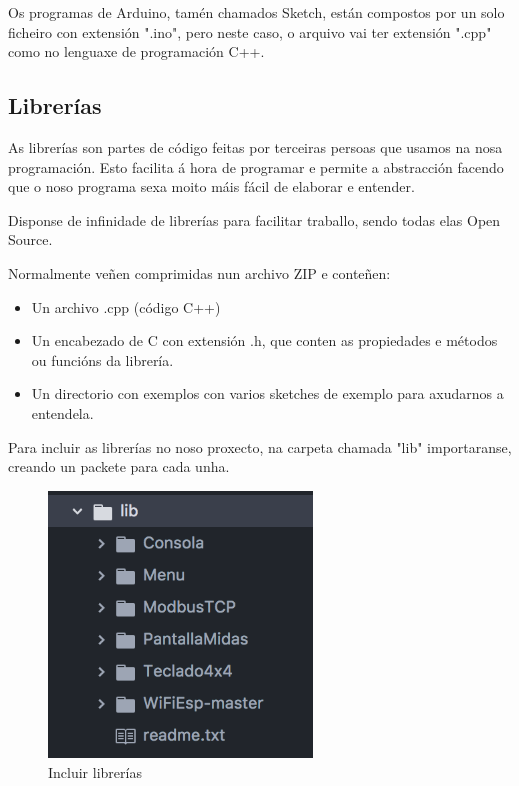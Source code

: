 \documentclass[11pt,twoside]{book}
\begin{document}
Os programas de Arduino, tamén chamados Sketch, están compostos por un solo ficheiro con extensión ".ino", pero neste caso, o arquivo vai ter extensión ".cpp" como no lenguaxe de programación C++.

\subsection{Librerías}

As librerías son partes de código feitas por terceiras persoas que usamos na nosa programación. Esto facilita á hora de programar e permite a abstracción facendo que o noso programa sexa moito máis fácil de elaborar e entender.

Disponse de infinidade de librerías para facilitar traballo, sendo todas elas Open Source.

Normalmente veñen comprimidas nun archivo ZIP e conteñen:
\begin{itemize}
\item Un archivo .cpp (código C++)
\item Un encabezado de C con extensión .h, que conten as propiedades e métodos ou funcións da librería.
\item Un directorio con exemplos con varios sketches de exemplo para axudarnos a entendela.
\end{itemize}

Para incluir as librerías no noso proxecto, na carpeta chamada "lib" importaranse, creando un packete para cada unha.

\begin{figure}[H]
	\begin{center}
		\includegraphics[width=7cm]{images/librerias.png}
	\end{center}
	\caption{Incluir librerías}
	\label{fig:LibreriasAtom}
\end{figure}
\end{document}
